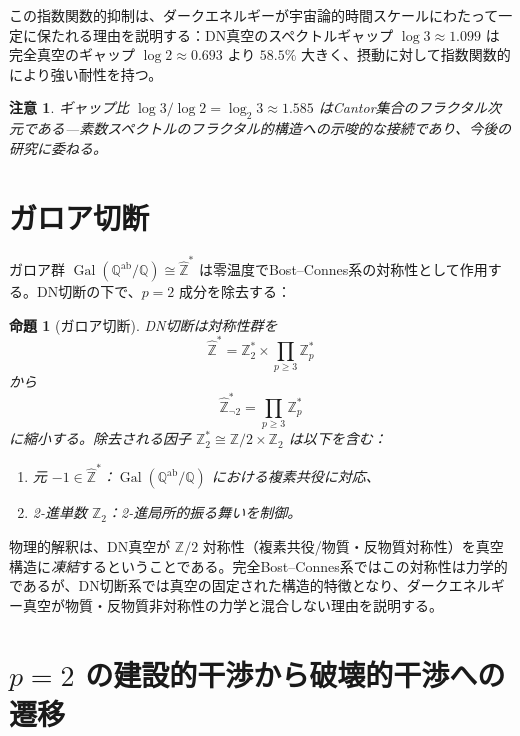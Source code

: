 \documentclass[12pt,a4paper]{article}
\newtheorem{proposition}[theorem]{命題}
\newtheorem{remark}[theorem]{注意}
\newcommand{\Gal}{\operatorname{Gal}}
\newcommand{\Zhat}{\hat{\mathbb{Z}}}
\newcommand{\Qab}{\mathbb{Q}^{\mathrm{ab}}}
\begin{document}
この指数関数的抑制は、ダークエネルギーが宇宙論的時間スケールにわたって一定に保たれる理由を説明する：DN真空のスペクトルギャップ $\log 3 \approx 1.099$ は完全真空のギャップ $\log 2 \approx 0.693$ より $58.5\%$ 大きく、摂動に対して指数関数的により強い耐性を持つ。

\begin{remark}
ギャップ比 $\log 3/\log 2 = \log_2 3 \approx 1.585$ はCantor集合のフラクタル次元である---素数スペクトルのフラクタル的構造への示唆的な接続であり、今後の研究に委ねる。
\end{remark}

\section{ガロア切断}
\label{sec:galois}

ガロア群 $\Gal(\Qab/\mathbb{Q}) \cong \Zhat^*$ は零温度でBost--Connes系の対称性として作用する。DN切断の下で、$p=2$ 成分を除去する：

\begin{proposition}[ガロア切断]\label{prop:galois}
DN切断は対称性群を
\begin{equation}
  \Zhat^* = \mathbb{Z}_2^* \times \prod_{p \geq 3}\mathbb{Z}_p^*
\end{equation}
から
\begin{equation}
  \Zhat_{\neg 2}^* = \prod_{p \geq 3}\mathbb{Z}_p^*
\end{equation}
に縮小する。除去される因子 $\mathbb{Z}_2^* \cong \mathbb{Z}/2 \times \mathbb{Z}_2$ は以下を含む：
\begin{enumerate}[label=(\alph*)]
\item 元 $-1 \in \Zhat^*$：$\Gal(\Qab/\mathbb{Q})$ における複素共役に対応、
\item 2-進単数 $\mathbb{Z}_2$：2-進局所的振る舞いを制御。
\end{enumerate}
\end{proposition}

物理的解釈は、DN真空が $\mathbb{Z}/2$ 対称性（複素共役/物質・反物質対称性）を真空構造に\emph{凍結}するということである。完全Bost--Connes系ではこの対称性は力学的であるが、DN切断系では真空の固定された構造的特徴となり、ダークエネルギー真空が物質・反物質非対称性の力学と混合しない理由を説明する。

\section{$p=2$ の建設的干渉から破壊的干渉への遷移}
\label{sec:interference}
\end{document}
